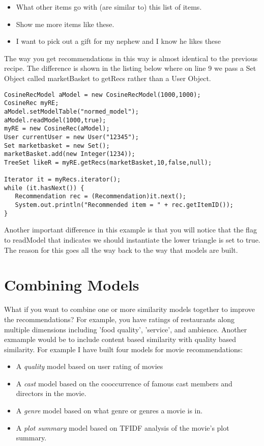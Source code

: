 \documentclass[12pt]{article}
\begin{document}
\begin{itemize}
\item What other items go with (are similar to) this list of items.
\item Show me more items like these.
\item I want to pick out a gift for my nephew and I know he likes
  these
\end{itemize}

The way you get recommendations in this way is almost identical to the
previous recipe.  The difference is shown in the listing below where
on line 9 we pass a Set Object called marketBasket to getRecs rather
than a User Object. 

\begin{lstlisting}
CosineRecModel aModel = new CosineRecModel(1000,1000);
CosineRec myRE;
aModel.setModelTable("normed_model");
aModel.readModel(1000,true);
myRE = new CosineRec(aModel);
User currentUser = new User("12345");
Set marketbasket = new Set();
marketBasket.add(new Integer(1234));
TreeSet likeR = myRE.getRecs(marketBasket,10,false,null);

Iterator it = myRecs.iterator();
while (it.hasNext()) {
   Recommendation rec = (Recommendation)it.next();
   System.out.println("Recommended item = " + rec.getItemID());
}
\end{lstlisting}

Another important difference in this example is that you will notice
that the flag to readModel that indicates we should instantiate the
lower triangle is set to true.  The reason for this goes all the way
back to the way that models are built.

\section{Combining Models}
\label{sec:comb}
What if you want to combine one or more similarity models together to
improve the recommendations?  For example, you have ratings of restaurants
along  multiple dimensions including 'food quality', 'service', and
ambience.  Another exmample would be to include content based
similarity with quality based similarity.  For example I have built
four models for movie recommendations:
\begin{itemize}
\item A \textit{quality} model based on user rating of movies
\item A \textit{cast} model based on the cooccurrence of famous cast
  members and directors in the movie.
\item A \textit{genre} model based on what genre or genres a movie is
  in.
\item A \textit{plot summary} model based on TFIDF analysis of the
  movie's plot summary.
\end{itemize}
\end{document}
